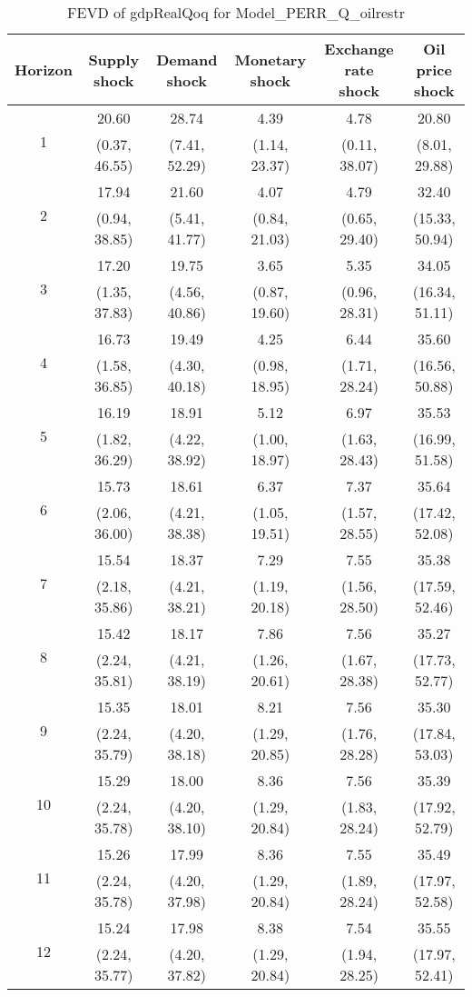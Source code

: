 \documentclass{article}
\begin{document}
\begin{table}
	\footnotesize
	\caption{FEVD of gdpRealQoq for Model_PERR_Q_oilrestr}
	\begin{tabular}{cccccc}
		Horizon & Supply shock & Demand shock & Monetary shock & Exchange rate shock & Oil price shock\\ \hline
		\multirow{2}{*}{1} & 20.60 & 28.74 & 4.39 & 4.78 & 20.80\\
		 & (0.37, 46.55) & (7.41, 52.29) & (1.14, 23.37) & (0.11, 38.07) & (8.01, 29.88)\\
		\multirow{2}{*}{2} & 17.94 & 21.60 & 4.07 & 4.79 & 32.40\\
		 & (0.94, 38.85) & (5.41, 41.77) & (0.84, 21.03) & (0.65, 29.40) & (15.33, 50.94)\\
		\multirow{2}{*}{3} & 17.20 & 19.75 & 3.65 & 5.35 & 34.05\\
		 & (1.35, 37.83) & (4.56, 40.86) & (0.87, 19.60) & (0.96, 28.31) & (16.34, 51.11)\\
		\multirow{2}{*}{4} & 16.73 & 19.49 & 4.25 & 6.44 & 35.60\\
		 & (1.58, 36.85) & (4.30, 40.18) & (0.98, 18.95) & (1.71, 28.24) & (16.56, 50.88)\\
		\multirow{2}{*}{5} & 16.19 & 18.91 & 5.12 & 6.97 & 35.53\\
		 & (1.82, 36.29) & (4.22, 38.92) & (1.00, 18.97) & (1.63, 28.43) & (16.99, 51.58)\\
		\multirow{2}{*}{6} & 15.73 & 18.61 & 6.37 & 7.37 & 35.64\\
		 & (2.06, 36.00) & (4.21, 38.38) & (1.05, 19.51) & (1.57, 28.55) & (17.42, 52.08)\\
		\multirow{2}{*}{7} & 15.54 & 18.37 & 7.29 & 7.55 & 35.38\\
		 & (2.18, 35.86) & (4.21, 38.21) & (1.19, 20.18) & (1.56, 28.50) & (17.59, 52.46)\\
		\multirow{2}{*}{8} & 15.42 & 18.17 & 7.86 & 7.56 & 35.27\\
		 & (2.24, 35.81) & (4.21, 38.19) & (1.26, 20.61) & (1.67, 28.38) & (17.73, 52.77)\\
		\multirow{2}{*}{9} & 15.35 & 18.01 & 8.21 & 7.56 & 35.30\\
		 & (2.24, 35.79) & (4.20, 38.18) & (1.29, 20.85) & (1.76, 28.28) & (17.84, 53.03)\\
		\multirow{2}{*}{10} & 15.29 & 18.00 & 8.36 & 7.56 & 35.39\\
		 & (2.24, 35.78) & (4.20, 38.10) & (1.29, 20.84) & (1.83, 28.24) & (17.92, 52.79)\\
		\multirow{2}{*}{11} & 15.26 & 17.99 & 8.36 & 7.55 & 35.49\\
		 & (2.24, 35.78) & (4.20, 37.98) & (1.29, 20.84) & (1.89, 28.24) & (17.97, 52.58)\\
		\multirow{2}{*}{12} & 15.24 & 17.98 & 8.38 & 7.54 & 35.55\\
		 & (2.24, 35.77) & (4.20, 37.82) & (1.29, 20.84) & (1.94, 28.25) & (17.97, 52.41)\\
	\end{tabular}
\label{tab:fevd-Model_PERR_Q_oilrestr-gdpRealQoq}
\end{table}
\end{document}
